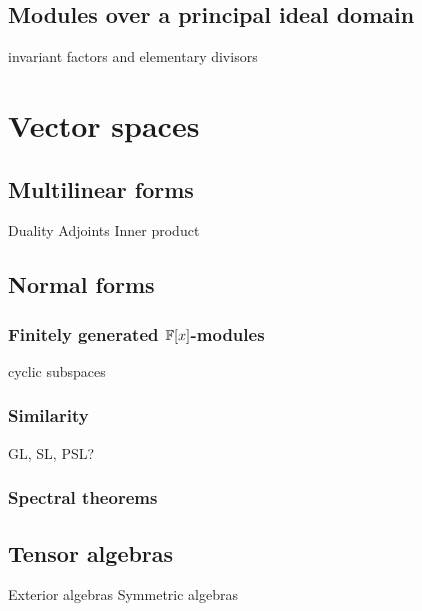 \documentclass{../note}
\begin{document}
\chapter{Modules over a principal ideal domain}
invariant factors and elementary divisors

















\part{Vector spaces}


\chapter{Multilinear forms}
Duality
Adjoints
Inner product




\chapter{Normal forms}
\section{Finitely generated $\mathbb{F}[x]$-modules}
cyclic subspaces

\section{Similarity}
GL, SL, PSL? %




\section{Spectral theorems}




\chapter{Tensor algebras}
Exterior algebras
Symmetric algebras
\end{document}
